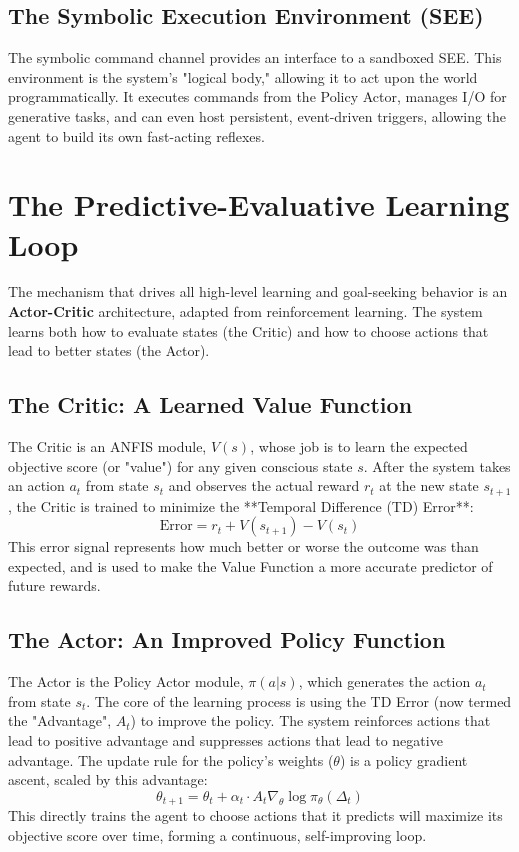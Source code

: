 \documentclass{article}
\begin{document}
\subsection{The Symbolic Execution Environment (SEE)}
The symbolic command channel provides an interface to a sandboxed SEE. This environment is the system's "logical body," allowing it to act upon the world programmatically. It executes commands from the Policy Actor, manages I/O for generative tasks, and can even host persistent, event-driven triggers, allowing the agent to build its own fast-acting reflexes.

\section{The Predictive-Evaluative Learning Loop}

The mechanism that drives all high-level learning and goal-seeking behavior is an \textbf{Actor-Critic} architecture, adapted from reinforcement learning. The system learns both how to evaluate states (the Critic) and how to choose actions that lead to better states (the Actor).

\subsection{The Critic: A Learned Value Function}
The Critic is an ANFIS module, $V(s)$, whose job is to learn the expected objective score (or "value") for any given conscious state $s$. After the system takes an action $a_t$ from state $s_t$ and observes the actual reward $r_t$ at the new state $s_{t+1}$, the Critic is trained to minimize the **Temporal Difference (TD) Error**:
$$ \text{Error} = r_t + V(s_{t+1}) - V(s_t) $$
This error signal represents how much better or worse the outcome was than expected, and is used to make the Value Function a more accurate predictor of future rewards.

\subsection{The Actor: An Improved Policy Function}
The Actor is the Policy Actor module, $\pi(a|s)$, which generates the action $a_t$ from state $s_t$. The core of the learning process is using the TD Error (now termed the "Advantage", $A_t$) to improve the policy. The system reinforces actions that lead to positive advantage and suppresses actions that lead to negative advantage. The update rule for the policy's weights ($\theta$) is a policy gradient ascent, scaled by this advantage:
$$ \theta_{t+1} = \theta_t + \alpha_t \cdot A_t \nabla_\theta \log \pi_\theta(\Delta_t) $$
This directly trains the agent to choose actions that it predicts will maximize its objective score over time, forming a continuous, self-improving loop.
\end{document}
